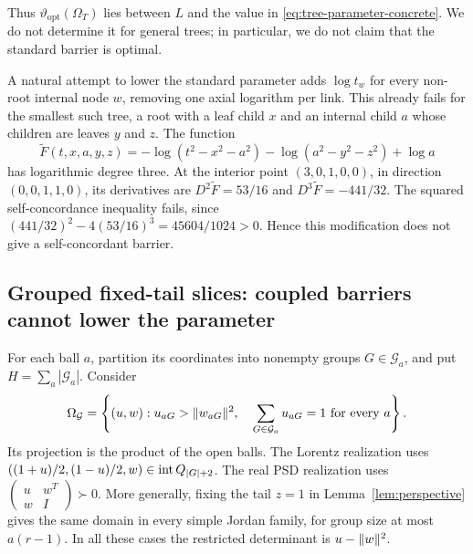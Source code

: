 Thus $\vartheta_{\mathrm{opt}}(\Omega_T)$ lies
between $L$ and the value in \eqref{eq:tree-parameter-concrete}.  We do
not determine it for general trees; in particular, we do not claim that
the standard barrier is optimal.

A natural attempt to lower the standard parameter adds $\log t_w$ for
every non-root internal node $w$, removing one axial logarithm per link.
This already fails for the smallest such tree, a root with a leaf child
$x$ and an internal child $a$ whose children are leaves $y$ and $z$.
The function
\[
 \widetilde F(t,x,a,y,z)
 =-\log(t^2-x^2-a^2)-\log(a^2-y^2-z^2)+\log a
\]
has logarithmic degree three.  At the interior point
$(3,0,1,0,0)$, in direction $(0,0,1,1,0)$, its derivatives are
$D^2\widetilde F=53/16$ and $D^3\widetilde F=-441/32$.
The squared self-concordance inequality fails, since
$(441/32)^2-4(53/16)^3=45604/1024>0$.
Hence this modification does not give a self-concordant barrier.

\subsection{Grouped fixed-tail slices: coupled barriers cannot lower the parameter}

For each ball $a$, partition its coordinates into nonempty groups
$G\in\mathcal G_a$, and put $H=\sum_a|\mathcal G_a|$.
Consider
\begin{equation}\label{eq:grouped-domain-concrete}
 \Omega_{\mathcal G}
 =\left\{(u,w):u_{aG}>\lVert w_{aG}\rVert^2,\quad
                   \sum_{G\in\mathcal G_a}u_{aG}=1\text{ for every }a\right\}.
\end{equation}
Its projection is the product of the open balls.  The Lorentz realization
uses $((1+u)/2,(1-u)/2,w)\in\operatorname{int} Q_{|G|+2}$.
The real PSD realization uses
$\left(\begin{smallmatrix}u&w^T\\w&I\end{smallmatrix}\right)\succ0$.
More generally, fixing the tail $z=1$ in
Lemma~\ref{lem:perspective} gives the same domain in every simple
Jordan family, for group size at most $a(r-1)$.
In all these cases the restricted determinant is
$u-\lVert w\rVert^2$.

